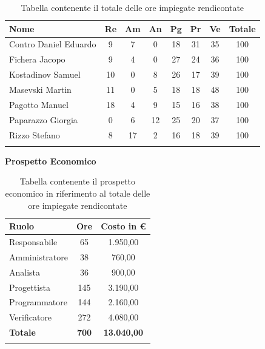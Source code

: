 \documentclass[../piano_di_progetto.tex]{subfiles}
\begin{document}
\begin{center}
	\begin{longtable}{|l|c|c|c|c|c|c|c|}
		\hline
		\rowcolor{lightgray}
		\textbf{Nome} & \textbf{Re} & \textbf{Am} & \textbf{An} & \textbf{Pg}  & \textbf{Pr}   & \textbf{Ve} & \textbf{Totale} \\

		\hline
			Contro Daniel Eduardo & 9 & 7 & 0 & 18 & 31 & 35 & 100 \\
			Fichera Jacopo & 9 & 4 & 0 & 27 & 24 & 36 & 100 \\
			Kostadinov Samuel & 10 & 0 & 8 & 26 & 17 & 39 & 100 \\		
			Masevski Martin & 11 & 0 & 5 & 18 & 18 & 48 & 100 \\
			Pagotto Manuel & 18 & 4 & 9 & 15 & 16 & 38 & 100 \\			
			Paparazzo Giorgia & 0 & 6 & 12 & 25 & 20 & 37 & 100 \\
			Rizzo Stefano & 8 & 17 & 2 & 16 & 18 & 39 & 100 \\
		\hline	
		\rowcolor{white}
		\caption{Tabella contenente il totale delle ore impiegate rendicontate}
	\end{longtable}
\end{center}


\vspace{3cm}

\textbf{Prospetto Economico}

\begin{center}
	\begin{longtable}{|l|c|c|}
		\hline
		\rowcolor{lightgray}
		\textbf{Ruolo} & \textbf{Ore} & \textbf{Costo in €}\\
		\hline
		
		Responsabile & 65 & 1.950,00 \\
		Amministratore & 38 & 760,00 \\
		Analista & 36 & 900,00 \\
		Progettista & 145 & 3.190,00 \\
		Programmatore & 144 & 2.160,00 \\
		Verificatore & 272 & 4.080,00 \\
		\hline
		\textbf{Totale} & \textbf{700} & \textbf{13.040,00}\\
		\hline
		\rowcolor{white}
		\caption{Tabella contenente il prospetto economico in riferimento al totale delle ore impiegate rendicontate}
	\end{longtable}
\end{center}
\end{document}
